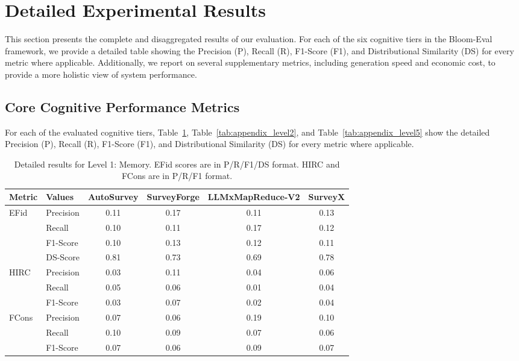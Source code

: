 \documentclass[11pt]{article}
\begin{document}
\section{Detailed Experimental Results}
\label{sec:appendix_detailed_results}

This section presents the complete and disaggregated results of our evaluation. For each of the six cognitive tiers in the Bloom-Eval framework, we provide a detailed table showing the Precision (P), Recall (R), F1-Score (F1), and Distributional Similarity (DS) for every metric where applicable. Additionally, we report on several supplementary metrics, including generation speed and economic cost, to provide a more holistic view of system performance.

\subsection{Core Cognitive Performance Metrics}
For each of the evaluated cognitive tiers, Table~\ref{tab:appendix_level1}, Table~\ref{tab:appendix_level2}, and Table~\ref{tab:appendix_level5} show the detailed Precision (P), Recall (R), F1-Score (F1), and Distributional Similarity (DS) for every metric where applicable.
\begin{table}[h!]
    \centering
    \caption{Detailed results for Level 1: Memory. EFid scores are in P/R/F1/DS format. HIRC and FCons are in P/R/F1 format.}
    \label{tab:appendix_level1}
    \begin{tabular}{llcccc}
        \toprule
        \textbf{Metric} & \textbf{Values} & \textbf{AutoSurvey} & \textbf{SurveyForge} & \textbf{LLMxMapReduce-V2} & \textbf{SurveyX} \\
        \midrule
        \multirow{4}{*}{EFid} 
            & Precision & 0.11 & 0.17 & 0.11 & 0.13 \\
            & Recall    & 0.10 & 0.11 & 0.17 & 0.12 \\
            & F1-Score  & 0.10 & 0.13 & 0.12 & 0.11 \\
            & DS-Score  & 0.81 & 0.73 & 0.69 & 0.78 \\
        \midrule
        \multirow{3}{*}{HIRC} 
            & Precision & 0.03 & 0.11 & 0.04 & 0.06 \\
            & Recall    & 0.05 & 0.06 & 0.01 & 0.04 \\
            & F1-Score  & 0.03 & 0.07 & 0.02 & 0.04 \\
        \midrule
        \multirow{3}{*}{FCons} 
            & Precision & 0.07 & 0.06 & 0.19 & 0.10 \\
            & Recall    & 0.10 & 0.09 & 0.07 & 0.06 \\
            & F1-Score  & 0.07 & 0.06 & 0.09 & 0.07 \\
        \bottomrule
    \end{tabular}
\end{table}
\end{document}
